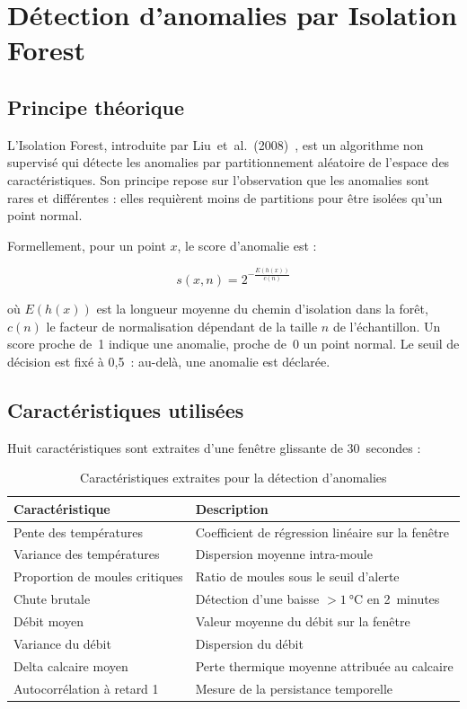\section{Détection d'anomalies par Isolation Forest}

\subsection{Principe théorique}

L'Isolation Forest, introduite par Liu~et~al.~(2008)~\cite{bib31}, est un algorithme non supervisé qui détecte les anomalies par partitionnement aléatoire de l'espace des caractéristiques. Son principe repose sur l'observation que les anomalies sont rares et différentes : elles requièrent moins de partitions pour être isolées qu'un point normal.

Formellement, pour un point \(x\), le score d'anomalie est :

\begin{equation}
s(x, n) = 2^{-\frac{E(h(x))}{c(n)}}
\label{eq:if_score}
\end{equation}

où \(E(h(x))\) est la longueur moyenne du chemin d'isolation dans la forêt, \(c(n)\) le facteur de normalisation dépendant de la taille \(n\) de l'échantillon. Un score proche de~1 indique une anomalie, proche de~0 un point normal. Le seuil de décision est fixé à 0,5~: au-delà, une anomalie est déclarée.

\subsection{Caractéristiques utilisées}

Huit caractéristiques sont extraites d'une fenêtre glissante de 30~secondes :

\begin{table}[htbp]
\centering
\caption{Caractéristiques extraites pour la détection d'anomalies}
\label{tab:features_if}
\begin{tabular}{p{}p{}}
\toprule
\textbf{Caractéristique} & \textbf{Description} \\
\midrule
Pente des températures & Coefficient de régression linéaire sur la fenêtre \\
Variance des températures & Dispersion moyenne intra-moule \\
Proportion de moules critiques & Ratio de moules sous le seuil d'alerte \\
Chute brutale & Détection d'une baisse \(>1~\si{\celsius}\) en 2~minutes \\
Débit moyen & Valeur moyenne du débit sur la fenêtre \\
Variance du débit & Dispersion du débit \\
Delta calcaire moyen & Perte thermique moyenne attribuée au calcaire \\
Autocorrélation à retard 1 & Mesure de la persistance temporelle \\
\bottomrule
\end{tabular}
\end{table}

